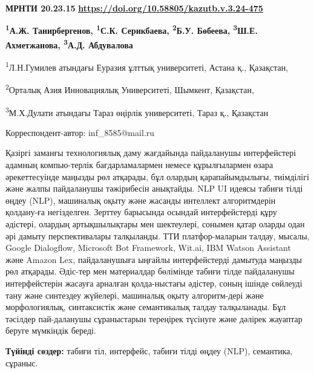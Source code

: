 \newpage
{\bfseries МРНТИ 20.23.15}
\hfill {\bfseries \href{https://doi.org/10.58805/kazutb.v.3.24-475}{https://doi.org/10.58805/kazutb.v.3.24-475}}


\begin{center}
{\bfseries \textsuperscript{1}А.Ж. Танирбергенов, \textsuperscript{1}С.К.
Серикбаева\envelope, \textsuperscript{2}Б.У. Бөбеева,
\textsuperscript{3}Ш.Е. Ахметжанова, \textsuperscript{3}А.Д. Абдувалова}

\textsuperscript{1}Л.Н.Гумилев атындағы Еуразия ұлттық университеті,
Астана қ., Қазақстан,

\textsuperscript{2}Орталық Азия Инновациялық Университеті, Шымкент,
Қазақстан,

\textsuperscript{3}М.Х.Дулати атындағы Тараз өңірлік университеті, Тараз
қ., Қазақстан
\end{center}
\envelope Корреспондент-автор:  inf\_8585@mail.ru \vspace{0.5cm}

Қазіргі заманғы технологиялық даму жағдайында пайдаланушы интерфейстері
адамның компью-терлік бағдарламалармен немесе құрылғылармен өзара
әрекеттесуінде маңызды рөл атқарады, бұл олардың қарапайымдылығы,
тиімділігі және жалпы пайдаланушы тәжірибесін анықтайды. NLP UI идеясы
табиғи тілді өңдеу (NLP), машиналық оқыту және жасанды интеллект
алгоритмдерін қолдану-ға негізделген. Зерттеу барысында осындай
интерфейстерді құру әдістері, олардың артықшылықтары мен шектеулері,
сонымен қатар оларды одан әрі дамыту перспективалары талқыланды. ТТИ
платфор-маларын талдау, мысалы, Google Dialogflow, Microsoft Bot
Framework, Wit.ai, IBM Watson Assistant және Amazon Lex, пайдаланушыға
ыңғайлы интерфейстерді дамытуда маңызды рөл атқарады. Әдіс-тер мен
материалдар бөлімінде табиғи тілде пайдаланушы интерфейстерін жасауға
арналған қолда-ныстағы әдістер, соның ішінде сөйлеуді тану және синтездеу
жүйелері, машиналық оқыту алгоритм-дері және морфологиялық, синтаксистік
және семантикалық талдау талқыланады. Бұл тәсілдер пай-даланушы
сұраныстарын тереңірек түсінуге және дәлірек жауаптар беруге мүмкіндік
береді.

{\bfseries Түйінді сөздер:} табиғи тіл, интерфейс, табиғи тілді өңдеу
(NLP), семантика, сұраныс.



